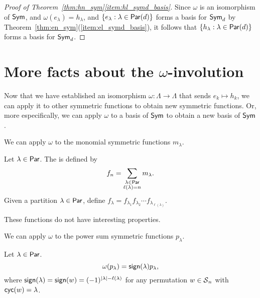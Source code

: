 \begin{proof}[Proof of Theorem~\ref{thm:hn_sym}\ref{item:hl_symd_basis}]
    Since \(\omega\) is an isomorphism of \(\operatorname{\mathsf{Sym}}\), and \(\omega(e_\lambda) = h_\lambda\), and \(\{e_\lambda : \lambda \in \operatorname{\mathsf{Par}}(d)\}\) forms a basis for \(\operatorname{\mathsf{Sym}}_d\) by Theorem~\ref{thm:en_sym}(\ref{item:el_symd_basis}), it follows that \(\{h_\lambda : \lambda \in \operatorname{\mathsf{Par}}(d)\}\) forms a basis for \(\operatorname{\mathsf{Sym}}_d\).
\end{proof}

\section{More facts about the \texorpdfstring{\(\omega\)}{omega}-involution}

Now that we have established an isomorphism \(\omega: \Lambda \to \Lambda\) that sends \(e_k \mapsto h_k\),
we can apply it to other symmetric functions to obtain new symmetric functions.
Or, more especifically, we can apply \(\omega\) to a basis of \(\operatorname{\mathsf{Sym}}\) to obtain a new basis of \(\operatorname{\mathsf{Sym}}\).

We can apply \(\omega\) to the monomial symmetric functions \(m_\lambda\).

\begin{definition}
		Let \(\lambda \in \operatorname{\mathsf{Par}}\).
	The  is defined by
	\begin{equation}
		f_n = \sum_{\substack{\lambda \in \operatorname{\mathsf{Par}} \\ \ell(\lambda) = n}} m_\lambda.
	\end{equation}
	Given a partition \(\lambda \in \operatorname{\mathsf{Par}}\), define \(f_\lambda = f_{\lambda_1}f_{\lambda_2}\cdots f_{\lambda_{\ell(\lambda)}}\).	
\end{definition}

These functions do not have interesting properties.

We can apply \(\omega\) to the power sum symmetric functions \(p_\lambda\).

\begin{theorem} \label{thm:omega-p-equals-pm-p}
	Let \(\lambda \in \operatorname{\mathsf{Par}}\).
	\begin{equation}
		\omega(p_\lambda) = \operatorname{\mathsf{sign}}(\lambda) p_{\lambda},
	\end{equation}
	where \(\operatorname{\mathsf{sign}}(\lambda) = \operatorname{\mathsf{sign}}(w) = (-1)^{|\lambda|-\ell(\lambda)}\) for any permutation \(w \in \operatorname{\mathcal{S}}_n\) with \(\operatorname{\mathsf{cyc}}(w) = \lambda\).
\end{theorem}

